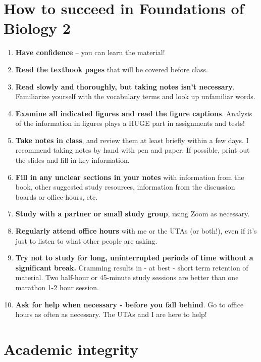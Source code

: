 \documentclass[
]{book}
\providecommand{\tightlist}{%
  \setlength{\itemsep}{0pt}\setlength{\parskip}{0pt}}
\begin{document}
\hypertarget{success}{%
\chapter{How to succeed in Foundations of Biology 2}\label{success}}

\begin{enumerate}
\def\labelenumi{\arabic{enumi}.}
\tightlist
\item
  \textbf{Have confidence} -- you can learn the material!\\
\item
  \textbf{Read the textbook pages} that will be covered before class.
\item
  \textbf{Read slowly and thoroughly, but taking notes isn't necessary}. Familiarize yourself with the vocabulary terms and look up unfamiliar words.
\item
  \textbf{Examine all indicated figures and read the figure captions}. Analysis of the information in figures plays a HUGE part in assignments and tests!
\item
  \textbf{Take notes in class}, and review them at least briefly within a few days. I recommend taking notes by hand with pen and paper. If possible, print out the slides and fill in key information.
\item
  \textbf{Fill in any unclear sections in your notes} with information from the book, other suggested study resources, information from the discussion boards or office hours, etc.
\item
  \textbf{Study with a partner or small study group}, using Zoom as necessary.
\item
  \textbf{Regularly attend office hours} with me or the UTAs (or both!), even if it's just to listen to what other people are asking.
\item
  \textbf{Try not to study for long, uninterrupted periods of time without a significant break.} Cramming results in - at best - short term retention of material. Two half-hour or 45-minute study sessions are better than one marathon 1-2 hour session.
\item
  \textbf{Ask for help when necessary - before you fall behind}. Go to office hours as often as necessary. The UTAs and I are here to help!
\end{enumerate}

\hypertarget{academic-integrity}{%
\chapter{Academic integrity}\label{academic-integrity}}
\end{document}
